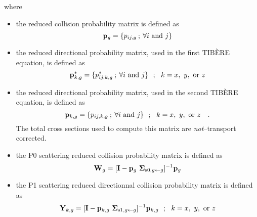 \goodbreak
\noindent where
\begin{itemize}
\item the reduced collision probability matrix is defined as
$${\bf p}_{g}=\{p_{ij,g}\> ;\> \forall i \ {\rm and} \ j \}$$
\item the reduced directional probability matrix, used in the first
TIB\`ERE equation, is defined as
$${\bf p}_{k,g}^*=\{p_{ij,k,g}^*\> ;\> \forall i \ {\rm and} \ j \} \ \ ; \ \
k=x, \ y, \ {\rm or } \ z$$
\item the reduced directional probability matrix, used in the second
TIB\`ERE equation, is defined as
$${\bf p}_{k,g}=\{p_{ij,k,g}\> ;\> \forall i \ {\rm and} \ j \} \ \ ; \ \
k=x, \ y, \ {\rm or } \ z \ \ \ .$$
The total cross sections used to compute this matrix are {\sl not}--transport
corrected.
\item the P0 scattering reduced collision probability matrix is defined as
$${\bf W}_{g}=[{\bf I}-{\bf p}_{g} \ {\bf\Sigma}_{{\rm s}0,g\gets g}]^{-1} {\bf p}_{g}$$
\item the P1 scattering reduced directionnal collision probability matrix is defined as
$${\bf Y}_{k,g}=[{\bf I}-{\bf p}_{k,g} \ {\bf\Sigma}_{{\rm s}1,g\gets g}]^{-1} {\bf p}_{k,g} \ \ ; \ \
k=x, \ y, \ {\rm or } \ z$$
\end{itemize}

\eject

